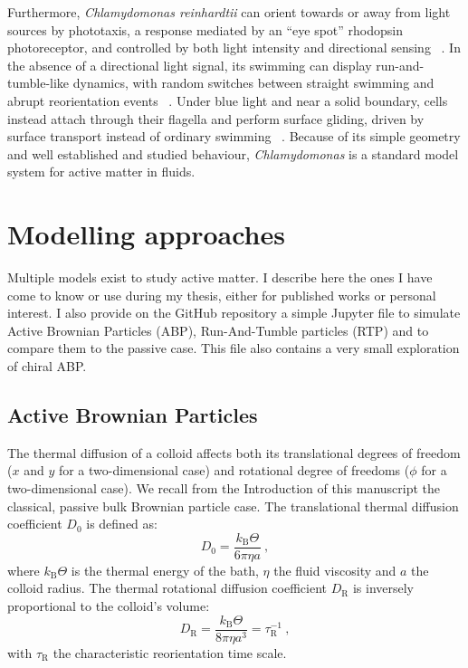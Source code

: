 Furthermore, \emph{Chlamydomonas reinhardtii} can orient towards or away from light sources by phototaxis, a response mediated by an ``eye spot'' rhodopsin photoreceptor, and controlled by both light intensity and directional sensing ~\cite{sineshchekov2002rhodopsins,bennett2015steering,ueki2016eyespot}. In the absence of a directional light signal, its swimming can display run-and-tumble-like dynamics, with random switches between straight swimming and abrupt reorientation events ~\cite{polin2009chlamydomonas}. Under blue light and near a solid boundary, cells instead attach through their flagella and perform surface gliding, driven by surface transport instead of ordinary swimming ~\cite{bloodgood1981gliding,kreis2018adhesion,shih2013intraflagellar,till2022gliding,fares_intraciliary_2025}. Because of its simple geometry and well established and studied behaviour, \emph{Chlamydomonas} is a standard model system for active matter in fluids. 



\section{Modelling approaches}
Multiple models exist to study active matter. I describe here the ones I have come to know or use during my thesis, either for published works or personal interest. 
I also provide on the GitHub repository a simple Jupyter file to simulate Active Brownian Particles (ABP), Run-And-Tumble particles (RTP) and to compare them to the passive case. This file also contains a very small exploration of chiral ABP.

\subsection{Active Brownian Particles}
The thermal diffusion of a colloid affects both its translational degrees of freedom ($x$ and $y$ for a two-dimensional case) and rotational degree of freedoms ($\phi$ for a two-dimensional case). We recall from the Introduction of this manuscript the classical, passive bulk Brownian particle case. The translational thermal diffusion coefficient $D_0$ is defined as:
\begin{equation}
D_0 = \dfrac{k_\mathrm{B}\Theta}{6\pi \eta a}~,
\label{ThermalD}
\end{equation}
where $k_\mathrm{B}\Theta$ is the thermal energy of the bath, $\eta$ the fluid viscosity and $a$ the colloid radius. The thermal rotational diffusion coefficient $D_\mathrm{R}$ is inversely proportional to the colloid's volume:
\begin{equation}
D_\mathrm{R} = \dfrac{k_\mathrm{B}\Theta}{8\pi \eta a^3 }= \tau_\mathrm{R}^{-1}~,
\label{ActiveR}
\end{equation}
with $\tau_\mathrm{R}$ the characteristic reorientation time scale.

